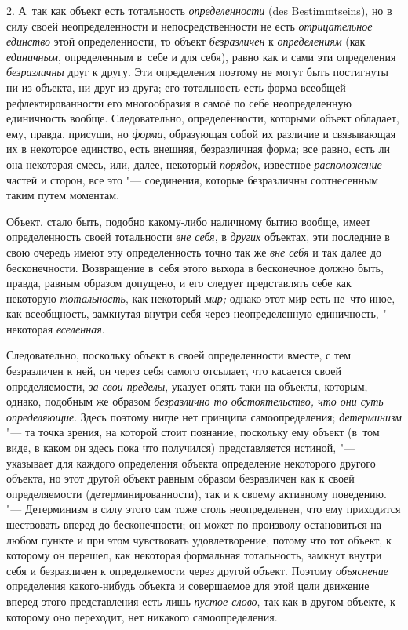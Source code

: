 2. А~так как объект есть тотальность {\em определенности} (des
Bestim\-mtseins), но в силу своей неопределенности и
непосредственности не есть {\em отрицательное единство}
этой определенности, то объект {\em безразличен} к
{\em определениям} (как {\em единичным},
определенным в~себе и для себя), равно как и сами эти
определения {\em безразличны}
друг к другу. Эти определения поэтому не могут быть
постигнуты ни из объекта, ни друг из друга; его тотальность есть форма
всеобщей рефлектированности его многообразия в самоё по себе неопределенную
единичность вообще. Следовательно, определенности, которыми объект
обладает, ему, правда, присущи, но {\em форма}, образующая
собой их различие и связывающая их в некоторое единство, есть внешняя,
безразличная форма; все равно, есть ли она некоторая смесь, или, далее,
некоторый {\em порядок}, известное
{\em расположение} частей
и сторон, все это "--- соединения, которые безразличны
соотнесенным таким путем моментам.

Объект, стало быть, подобно какому-либо наличному бытию
вообще, имеет определенность своей тотальности
{\em вне себя}, в {\em других} объектах,
эти последние в свою очередь имеют эту определенность точно так же
{\em вне себя} и так
далее до бесконечности. Возвращение в~себя этого выхода в бесконечное
должно быть, правда, равным образом допущено, и его следует представлять
себе как некоторую {\em тотальность}, как некоторый {\em мир;}
однако этот мир есть не~что иное, как всеобщность, замкнутая
внутри себя через неопределенную единичность, "--- некоторая {\em вселенная}.

Следовательно, поскольку объект в своей определенности вместе,
с тем безразличен к ней, он через себя самого отсылает, что касается своей
определяемости, {\em за свои пределы},
указует опять-таки на объекты, которым, однако, подобным же
образом {\em безразлично то
обстоятельство, что они суть определяющие}. Здесь поэтому
нигде нет принципа самоопределения;
{\em детерминизм} "--- та
точка зрения, на которой стоит познание, поскольку ему объект (в~том виде,
в каком он здесь пока что получился) представляется истиной, "---
указывает для каждого определения объекта определение
некоторого другого объекта, но этот другой объект равным образом
безразличен как к своей определяемости (детерминированности), так и к
своему активному поведению. "--- Детерминизм в силу этого сам
тоже столь неопределенен, что ему приходится шествовать вперед до
бесконечности; он может по произволу остановиться на любом пункте и при
этом чувствовать удовлетворение, потому что тот объект, к которому он
перешел, как некоторая формальная тотальность, замкнут внутри себя и
безразличен к определяемости через другой объект. Поэтому {\em объяснение}
определения какого-нибудь объекта и совершаемое для этой цели
движение вперед этого представления есть лишь {\em пустое слово}, так
как в другом объекте, к которому оно переходит, нет никакого самоопределения.

